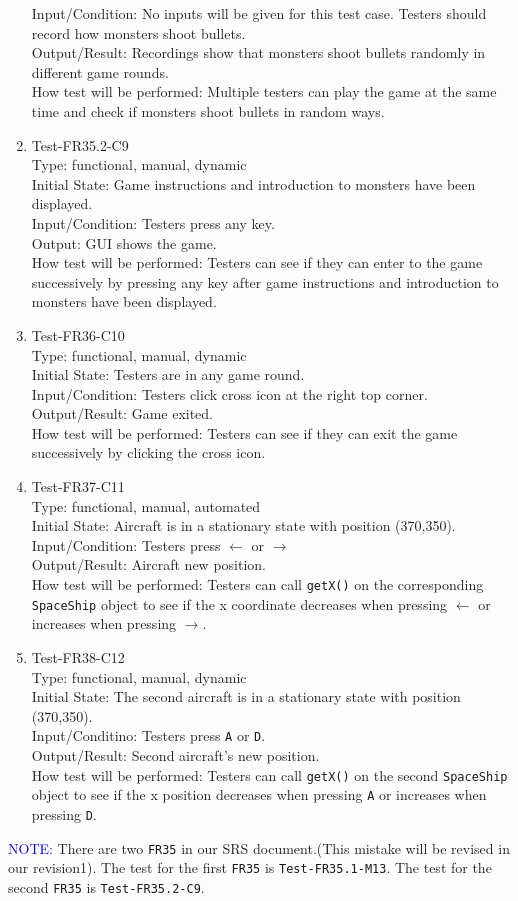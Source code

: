\documentclass[12pt]{article}
\begin{document}
\begin{enumerate}[1.]
Input/Condition: No inputs will be given for this test 
case. Testers should record how monsters shoot bullets.\\
Output/Result: Recordings show that monsters shoot
bullets randomly in different game rounds.\\
How test will be performed: Multiple testers can play
 the game at the same time and check if monsters shoot
  bullets in random ways.
\item Test-FR35.2-C9\\
Type: functional, manual, dynamic\\
Initial State:  Game instructions and introduction to 
monsters have been displayed.\\
Input/Condition: Testers press any key.\\
Output: GUI shows the game.\\
How test will be performed: Testers can see if they can enter to the game successively by pressing any key
after game instructions and introduction to 
monsters have been displayed.
\item Test-FR36-C10\\
Type: functional, manual, dynamic\\
Initial State: Testers are in any game round.\\
Input/Condition: Testers click cross icon at the right
top corner.\\
Output/Result: Game exited.\\
How test will be performed: Testers can see if they can exit the game successively by clicking the cross icon.
\item Test-FR37-C11\\
Type: functional, manual, automated\\
Initial State:  Aircraft is in a stationary state with position (370,350).\\
Input/Condition: Testers press $\leftarrow$ or $\rightarrow$\\
Output/Result: Aircraft new position.\\
How test will be performed: Testers can call \verb|getX()| on the corresponding \verb|SpaceShip| object to see if the x coordinate decreases when pressing $\leftarrow$ or increases when pressing $\rightarrow$.

\item Test-FR38-C12\\
Type: functional, manual, dynamic\\
Initial State: The second aircraft is in a stationary state with position (370,350).\\
Input/Conditino: Testers press \verb|A| or \verb|D|.\\
Output/Result: Second aircraft's new position.\\
How test will be performed: Testers can call \verb|getX()| on the second \verb|SpaceShip| object to see if the x position decreases when pressing \verb|A| or increases when pressing \verb|D|.
\end{enumerate}
\textcolor{blue}{NOTE:} There are two \verb|FR35| in our
SRS document.(This mistake will be revised in our revision1). The test for the first \verb|FR35| is \verb|Test-FR35.1-M13|. The test for the second \verb|FR35| is \verb|Test-FR35.2-C9|.
\end{document}
